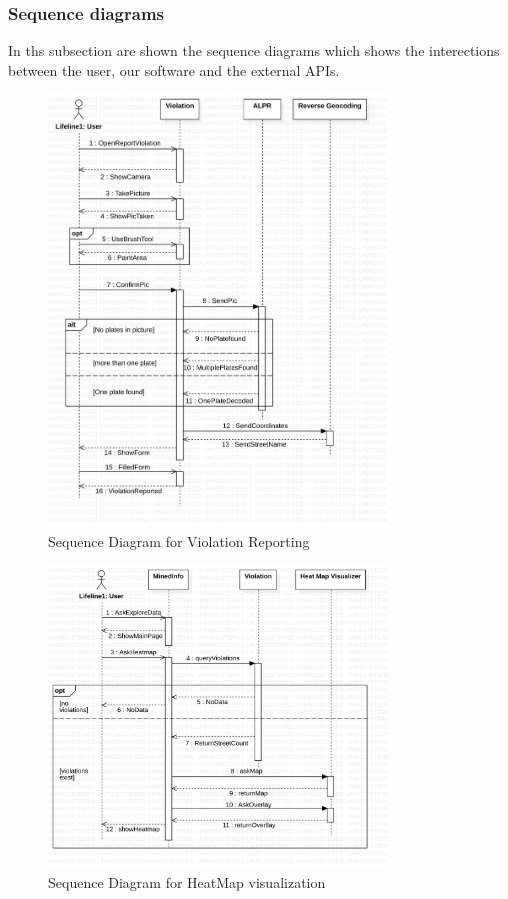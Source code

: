\subsubsection{Sequence diagrams}
In ths subsection are shown the sequence diagrams which shows the interections between the user, our software and the external APIs.

\begin{figure}[H]
   \centering
     \includegraphics[width=0.8\textwidth]{Images/SequenceViolation.png}
     \caption{Sequence Diagram for Violation Reporting}   \label{fig:sequenceViolation}
\end{figure}

\begin{figure}[H]
   \centering
     \includegraphics[width=0.8\textwidth]{Images/SequenceHeatmap.png}
     \caption{Sequence Diagram for HeatMap visualization}   \label{fig:sequenceHeatmap}
\end{figure}



